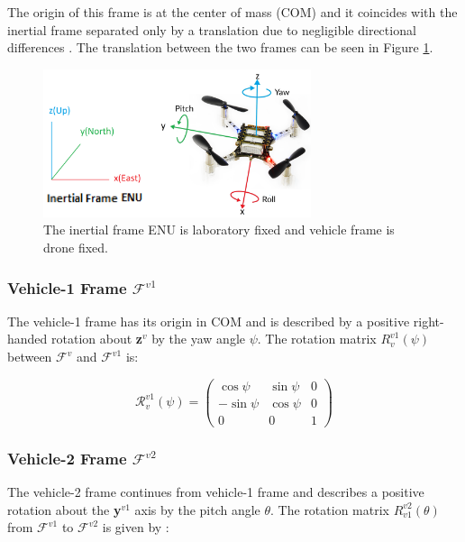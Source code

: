 The origin of this frame is at the center of mass (COM) and it coincides with the inertial frame separated only by a translation due to negligible directional differences \cite{beard2012small}. The translation between the two frames can be seen in Figure \ref{figure:frame_inertial}.

\begin{figure}[H]
\centering
 \includegraphics[width=0.7\textwidth]{Figures/frames_crazyflie.png}
 \caption{The inertial frame ENU is laboratory fixed and vehicle frame is drone fixed.}
 \label{figure:frame_inertial}
\end{figure}

\subsubsection{Vehicle-1 Frame \texorpdfstring{$\mathcal{F}^{v1}$}{Vehicle-1 Frame}}
 The vehicle-1 frame has its origin in COM and is described by a positive right-handed rotation about \textbf{z}${^v}$ by the yaw angle $\psi$.
 The rotation matrix ${R}^{v1}_{v}(\psi)$ between $\mathcal{F}^v$ and $\mathcal{F}^{v1}$ is\cite{beard2012small}:
 
\begin{equation*}
    \mathcal{R}^{v1}_{v}(\psi) = \begin{pmatrix}
    \cos\psi & \sin\psi & 0\\
    -\sin\psi & \cos\psi & 0\\
    0 & 0 & 1
    \end{pmatrix}
\end{equation*}

\subsubsection{Vehicle-2 Frame \texorpdfstring{$\mathcal{F}^{v2}$}{Vehicle-2 Frame}}
The vehicle-2 frame continues from vehicle-1 frame and describes a positive rotation about the \textbf{y}$^{v1}$ axis by the pitch angle $\theta$. The rotation matrix ${R}^{v2}_{v1}(\theta)$ from $\mathcal{F}^{v1}$ to $\mathcal{F}^{v2}$ is given by \cite{beard2012small}:

